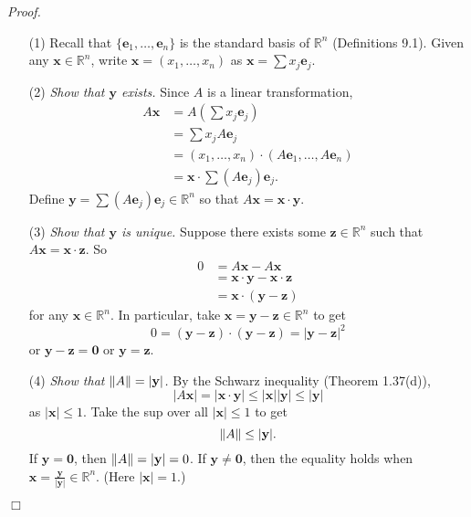 \documentclass{article}
\begin{document}
\emph{Proof.}
\begin{enumerate}
\item[(1)]
  Recall that $\{ \mathbf{e}_1, \ldots, \mathbf{e}_n \}$
  is the standard basis of $\mathbb{R}^n$ (Definitions 9.1).
  Given any $\mathbf{x} \in \mathbb{R}^n$,
  write $\mathbf{x} = (x_1, \ldots, x_n)$ as $\mathbf{x} = \sum x_j \mathbf{e}_j$.

\item[(2)]
  \emph{Show that $\mathbf{y}$ exists.}
  Since $A$ is a linear transformation,
  \begin{align*}
    A\mathbf{x}
    &= A\left(\sum x_j \mathbf{e}_j\right) \\
    &= \sum x_j A\mathbf{e}_j \\
    &= (x_1, \ldots, x_n) \cdot (A\mathbf{e}_1, \ldots, A\mathbf{e}_n) \\
    &= \mathbf{x} \cdot \sum (A\mathbf{e}_j) \mathbf{e}_j.
  \end{align*}
  Define $\mathbf{y} = \sum (A\mathbf{e}_j) \mathbf{e}_j \in \mathbb{R}^n$
  so that $A\mathbf{x} = \mathbf{x} \cdot \mathbf{y}$.

\item[(3)]
  \emph{Show that $\mathbf{y}$ is unique.}
  Suppose there exists some $\mathbf{z} \in \mathbb{R}^n$
  such that $A\mathbf{x} = \mathbf{x} \cdot \mathbf{z}$.
  So
  \begin{align*}
    0
    &= A\mathbf{x} -  A\mathbf{x} \\
    &= \mathbf{x} \cdot \mathbf{y}-\mathbf{x} \cdot \mathbf{z} \\
    &= \mathbf{x} \cdot (\mathbf{y}-\mathbf{z})
  \end{align*}
  for any $\mathbf{x} \in \mathbb{R}^n$.
  In particular, take $\mathbf{x} = \mathbf{y}-\mathbf{z} \in \mathbb{R}^n$
  to get
  \[
    0
    = (\mathbf{y}-\mathbf{z}) \cdot (\mathbf{y}-\mathbf{z})
    = |\mathbf{y}-\mathbf{z}|^2
  \]
  or $\mathbf{y}-\mathbf{z} = \mathbf{0}$ or $\mathbf{y}=\mathbf{z}$.

\item[(4)]
  \emph{Show that $\norm{A} = |\mathbf{y}|$.}
  By the Schwarz inequality (Theorem 1.37(d)),
  \[
    |A\mathbf{x}| = |\mathbf{x} \cdot \mathbf{y}| \leq |\mathbf{x}||\mathbf{y}|
    \leq |\mathbf{y}|
  \]
  as $|\mathbf{x}| \leq 1$.
  Take the sup over all $|\mathbf{x}| \leq 1$ to get
  \[
    \norm{A} \leq |\mathbf{y}|.
  \]
  If $\mathbf{y} = \mathbf{0}$, then $\norm{A} = |\mathbf{y}| = 0$.
  If $\mathbf{y} \neq \mathbf{0}$,
  then the equality holds when
  $\mathbf{x} = \frac{\mathbf{y}}{|\mathbf{y}|} \in \mathbb{R}^n$.
  (Here $|\mathbf{x}| = 1$.)
\end{enumerate}
$\Box$ \\\\
\end{document}

